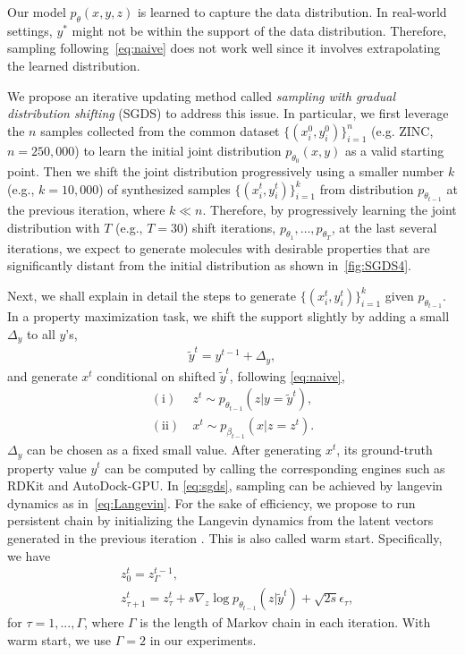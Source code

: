 \documentclass[accepted]{uai2023} %
\begin{document}
Our model $p_\theta(x, y, z)$ is learned to capture the data distribution. In real-world settings, $y^*$ might not be within the support of the data distribution. Therefore, sampling following~\cref{eq:naive} does not work well since it involves extrapolating the learned distribution. 

We propose an iterative updating method called \textit{sampling with gradual distribution shifting} (SGDS) to address this issue. In particular, we first leverage the $n$ samples collected from the common dataset  $\{(x_i^{0}, y_i^{0})\}_{i=1}^n$ (e.g. ZINC, $n = 250,000$) to learn the initial joint distribution $p_{\theta_0}(x,y)$ as a valid starting point. Then we shift the joint distribution progressively using a smaller number $k$ (e.g., $k = 10,000$) of synthesized samples $\{(x_i^{t}, y_i^{t})\}_{i=1}^{k}$ from distribution $p_{\theta_{t-1}}$ at the previous iteration, where $k \ll n$. Therefore, by progressively learning the joint distribution with $T$ (e.g., $T = 30$) shift iterations, $p_{\theta_{1}},\dots,p_{\theta_{T}}$, at the last several iterations, we expect to generate molecules with desirable properties that are significantly distant from the initial distribution as shown in~\cref{fig:SGDS4}. 

Next, we shall explain in detail the steps to generate $\{(x_i^{t}, y_i^{t})\}_{i=1}^{k}$ given $p_{\theta_{t-1}}$. In a property maximization task, we shift the support slightly by adding a small $\Delta_y$ to all $y$'s, 
\begin{align}
    \tilde{y}^t = y^{t-1} + \Delta_y,
\end{align}
and generate $x^t$ conditional on shifted $\tilde{y}^t$, following \cref{eq:naive},
\begin{align}
\label{eq:sgds}
    (\mathrm{i}) \  &z^t \sim p_{\theta_{t-1}}(z|y=\tilde{y}^t), \\ (\mathrm{ii}) \ &x^t \sim p_{\beta_{t-1}}(x|z=z^t).
\end{align} 
$\Delta_y$ can be chosen as a fixed small value. After generating $x^t$, its ground-truth property value $y^t$ can be computed by calling the corresponding engines such as RDKit and AutoDock-GPU. In \cref{eq:sgds}, sampling can be achieved by langevin dynamics as in~\cref{eq:Langevin}. For the sake of efficiency, we propose to run persistent chain by initializing the Langevin dynamics from the latent vectors generated in the previous iteration \cite{han2017abp}. This is also called warm start. Specifically, we have 
\begin{align} 
&z_0^t = z^{t-1}_\Gamma,\nonumber \\
&z^t_{\tau+1} = z^t_\tau + s \nabla_z \log p_{\theta_{t-1}}(z|\tilde{y}^t) + \sqrt{2s} \epsilon_\tau,
\label{eq:warm_start}
\end{align}
for $\tau = 1, ..., \Gamma$, where $\Gamma$ is the length of Markov chain in each iteration. With warm start, we use $\Gamma=2$ in our experiments. 
\end{document}
